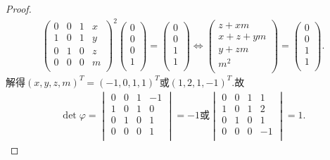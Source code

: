 \documentclass[../../main.tex]{subfiles}%
\begin{document}
\begin{proof}
\begin{align*}
\begin{pmatrix}
0&		0&		1&		x\\
1&		0&		1&		y\\
0&		1&		0&		z\\
0&		0&		0&		m\\
\end{pmatrix}^2 \left( \begin{array}{c}
0\\
0\\
0\\
1\\
\end{array} \right) =\left( \begin{array}{c}
0\\
0\\
1\\
1\\
\end{array} \right) \Longleftrightarrow \left( \begin{array}{c}
z+xm\\
x+z+ym\\
y+zm\\
m^2\\
\end{array} \right) =\left( \begin{array}{c}
0\\
0\\
1\\
1\\
\end{array} \right) .
\end{align*}
解得$(x,y,z,m)^T=(-1,0,1,1)^T$或$(1,2,1,-1)^T$.故
\begin{align*}
\det \varphi=\begin{vmatrix}
0&		0&		1&		-1\\
1&		0&		1&		0\\
0&		1&		0&		1\\
0&		0&		0&		1\\
\end{vmatrix}=-1\text{或}\begin{vmatrix}
0&		0&		1&		1\\
1&		0&		1&		2\\
0&		1&		0&		1\\
0&		0&		0&		-1\\
\end{vmatrix}=1.
\end{align*}
\end{proof}
\end{document}
